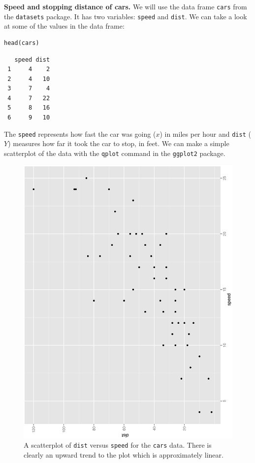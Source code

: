 \documentclass[captions=tableheading]{scrbook}
\begin{document}
\begin{example}
\textbf{Speed and stopping distance of cars.} We will use the data frame \texttt{cars} from the \texttt{datasets} package. It has two variables: \texttt{speed} and \texttt{dist}. We can take a look at some of the values in the data frame: 

\lstset{language=R}
\begin{lstlisting}
head(cars)
\end{lstlisting}

\begin{verbatim}
   speed dist
 1     4    2
 2     4   10
 3     7    4
 4     7   22
 5     8   16
 6     9   10
\end{verbatim}

The \texttt{speed} represents how fast the car was going (\(x\)) in miles per hour and \texttt{dist} (\(Y\)) measures how far it took the car to stop, in feet. We can make a simple scatterplot of the data with the \texttt{qplot} command in the \texttt{ggplot2} package. 

\begin{figure}[th]
  \includegraphics[angle=270, totalheight=4in]{ps/slr/carscatter.ps}
  \caption[Scatterplot of \texttt{dist} versus \texttt{speed} for the \texttt{cars} data]{\small A scatterplot of \texttt{dist} versus \texttt{speed} for the \texttt{cars} data.  There is clearly an upward trend to the plot which is approximately linear.}
  \label{fig-Scatter-cars}
\end{figure}




\end{example}
\end{document}
